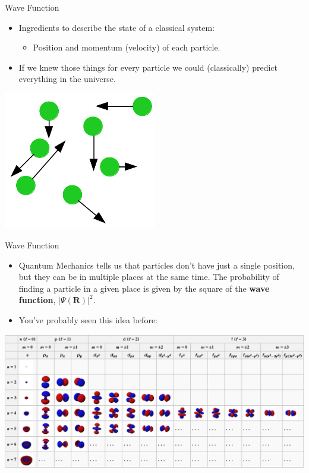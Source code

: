 \documentclass{beamer}
\newcommand{\R}{\mathbf{R}}
\begin{document}
\begin{frame}{Wave Function}
\begin{itemize}
   \item Ingredients to describe the state of a classical system:
   \begin{itemize}
      \item Position and momentum (velocity) of each particle.
   \end{itemize}
   \item If we knew those things for every particle we could (classically) predict everything in the universe.
\end{itemize}
\begin{center}
   \includegraphics[width=0.5\textwidth]{figures/pos_vel.png}
\end{center}
\end{frame}

\begin{frame}{Wave Function}
\begin{itemize}
   \item Quantum Mechanics tells us that particles don't have just a single position, but they can be in multiple places at the same time. The probability of finding a particle in a given place is given by the square of the {\bf wave function}, $\left|\Psi(\R)\right|^2$.
   \item You've probably seen this idea before:
\end{itemize}
\begin{center}
   \includegraphics[width=1.0\textwidth]{figures/ylm_orbitals.png}
\end{center}
\end{frame}
\end{document}
